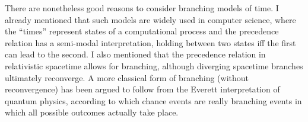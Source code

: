 

There are nonetheless good reasons to consider branching models of time. I already
mentioned that such models are widely used in computer science, where
the ``times'' represent states of a computational process and the precedence
relation has a semi-modal interpretation, holding between two states iff the
first can lead to the second.
I also mentioned that the precedence relation in relativistic spacetime allows
for branching, although diverging spacetime branches ultimately reconverge. A
more classical form of branching (without reconvergence) has been argued to
follow from the Everett interpretation of quantum physics, according to which
chance events are really branching events in
which all possible outcomes actually take place.

